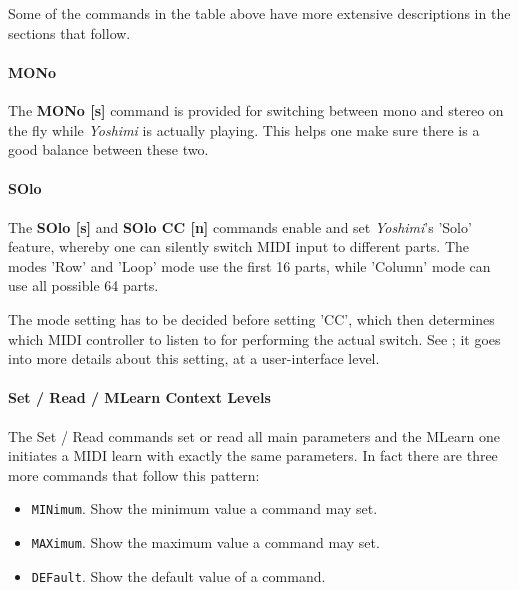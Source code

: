
   Some of the commands in the table above have more extensive descriptions
   in the sections that follow.

\paragraph{MONo}
\label{paragraph:command_line_mono}
    The \textbf{MONo [s]} command is provided for switching between mono and
    stereo on the fly while \textsl{Yoshimi} is actually playing. This helps
    one make sure there is a good balance between these two.

\paragraph{SOlo}
\label{paragraph:command_line_solo}
   The \textbf{SOlo [s]} and \textbf{SOlo CC [n]}
   commands enable and set \textsl{Yoshimi}'s 'Solo' feature,
   whereby one can silently switch MIDI input to different parts.
   The modes 'Row' and 'Loop' mode use the first 16 parts, while
   'Column' mode can use all possible 64 parts.

   The mode setting has to be decided before setting 'CC', which then
   determines which MIDI controller to listen to for performing the actual
   switch. See ; it goes into more
   details about this setting, at a user-interface level.

\paragraph{Set / Read / MLearn Context Levels}
\label{paragraph:command_line_context_levels}

   The Set / Read commands set or read all main parameters and the MLearn one
   initiates a MIDI learn with exactly the same parameters.
   In fact there are three more commands that follow this pattern:

   \begin{itemize}
   \item \texttt{MINimum}. Show the minimum value a command may set.
   \item \texttt{MAXimum}. Show the maximum value a command may set.
   \item \texttt{DEFault}. Show the default value of a command.
   \end{itemize}

